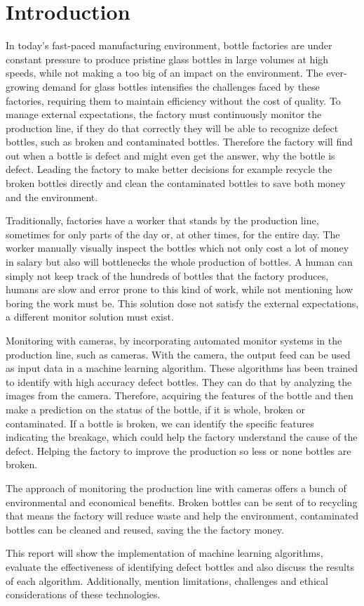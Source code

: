 \section{Introduction}

In today’s fast-paced manufacturing environment, bottle factories are under constant pressure to produce pristine glass bottles in large volumes at high speeds, while not making a too big of an impact on the environment. The ever-growing demand for glass bottles \cite{ReturnableBottles} intensifies the challenges faced by these factories, requiring them to maintain efficiency without the cost of quality.  To manage external expectations, the factory must continuously monitor the production line, if they do that correctly they will be able to recognize defect bottles, such as broken and contaminated bottles. Therefore the factory will find out when a bottle is defect and might even get the answer, why the bottle is defect. Leading the factory to make better decisions for example recycle the broken bottles directly and clean the contaminated bottles to save both money and the environment.
\par
Traditionally, factories have a worker that stands by the production line, sometimes for only parts of the day or, at other times, for the entire day. 
The worker manually visually inspect the bottles which not only cost a lot of money in salary but also will bottlenecks the whole production of bottles.
A human can simply not keep track of the hundreds of bottles that the factory produces, humans are slow and error prone to this kind of work, while not mentioning how boring the work must be. 
This solution dose not satisfy the external expectations, a different monitor solution must exist.
\par
Monitoring with cameras, by incorporating automated monitor systems in the production line, such as cameras. 
With the camera, the output feed can be used as input data in a machine learning algorithm. 
These algorithms has been trained to identify with high accuracy defect bottles. 
They can do that by analyzing the images from the camera. Therefore, acquiring the features of the bottle and then make a prediction on the status of the bottle, if it is whole, broken or contaminated.
If a bottle is broken, we can identify the specific features indicating the breakage, which could help the factory understand the cause of the defect.
Helping the factory to improve the production so less or none bottles are broken. 
\par
The approach of monitoring the production line with cameras offers a bunch of environmental and economical benefits. Broken bottles can be sent of to recycling that means the factory will reduce waste and help the environment, contaminated bottles can be cleaned and reused, saving the the factory  money.
\par
This report will show the implementation of machine learning algorithms, evaluate the effectiveness of identifying defect bottles and also discuss the results of each algorithm. Additionally, mention limitations, challenges and ethical considerations of these technologies.
